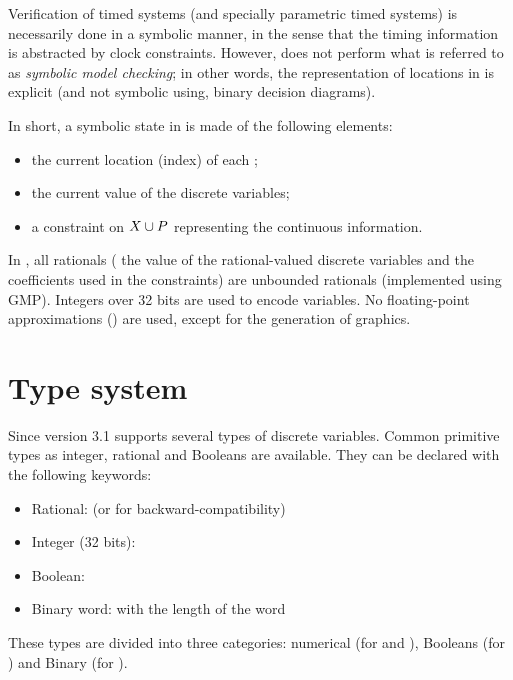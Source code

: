Verification of timed systems (and specially parametric timed systems) is necessarily done in a symbolic manner, in the sense that the timing information is abstracted by clock constraints.
However, \imitator{} does not perform what is referred to as \emph{symbolic model checking}; in other words, the representation of locations in \imitator{} is explicit (and not symbolic using, \eg{} binary decision diagrams).


In short, a symbolic state in \imitator{} is made of the following elements:
\begin{itemize}
	\item the current location (index) of each \IPTA{};
	\item the current value of the discrete variables;
	\item a constraint on $X \cup P$ representing the continuous information.
\end{itemize}
In \imitator{}, all rationals (\ie{} the value of the rational-valued discrete variables and the coefficients used in the constraints) are unbounded rationals (implemented using GMP).
Integers over 32 bits are used to encode  variables.
No floating-point approximations () are used, except for the generation of graphics.


\section{Type system}\label{section:type_system}

Since version 3.1 \imitator{} supports several types of discrete variables.
Common primitive types as integer, rational and Booleans are available.
They can be declared with the following keywords:

\begin{itemize}
	\item Rational:  (or  for backward-compatibility)
	\item Integer (32 bits): 
	\item Boolean: 
	\item Binary word:  with  the length of the word
\end{itemize}

These types are divided into three categories: numerical (for  and ), Booleans (for ) and Binary (for ).

